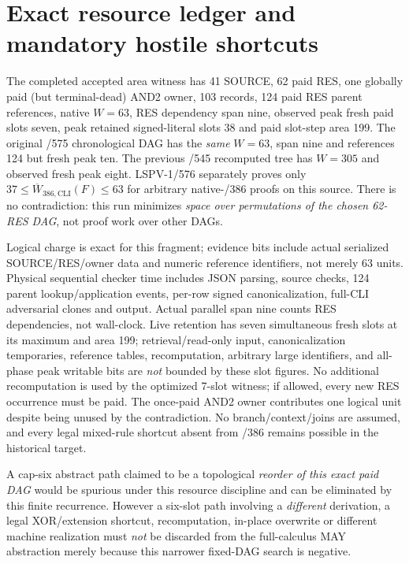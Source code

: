 \documentclass[11pt]{article}
\begin{document}
\section*{Exact resource ledger and mandatory hostile shortcuts}
The completed accepted area witness has 41 SOURCE, 62 paid RES, one globally paid (but terminal-dead) AND2 owner, 103 records, 124 paid RES parent references, native $W=63$, RES dependency span nine, observed peak fresh paid slots seven, peak retained signed-literal slots 38 and paid slot-step area 199. The original /575 chronological DAG has the \emph{same} $W=63$, span nine and references 124 but fresh peak ten. The previous /545 recomputed tree has $W=305$ and observed fresh peak eight. LSPV-1/576 separately proves only $37\le \overline W_{386,\mathrm{CLI}}(F)\le63$ for arbitrary native-/386 proofs on this source. There is no contradiction: this run minimizes \emph{space over permutations of the chosen 62-RES DAG}, not proof work over other DAGs.

Logical charge is exact for this fragment; evidence bits include actual serialized SOURCE/RES/owner data and numeric reference identifiers, not merely 63 units. Physical sequential checker time includes JSON parsing, source checks, 124 parent lookup/application events, per-row signed canonicalization, full-CLI adversarial clones and output. Actual parallel span nine counts RES dependencies, not wall-clock. Live retention has seven simultaneous fresh slots at its maximum and area 199; retrieval/read-only input, canonicalization temporaries, reference tables, recomputation, arbitrary large identifiers, and all-phase peak writable bits are \emph{not} bounded by these slot figures. No additional recomputation is used by the optimized 7-slot witness; if allowed, every new RES occurrence must be paid. The once-paid AND2 owner contributes one logical unit despite being unused by the contradiction. No branch/context/joins are assumed, and every legal mixed-rule shortcut absent from /386 remains possible in the historical target.

A cap-six abstract path claimed to be a topological \emph{reorder of this exact paid DAG} would be spurious under this resource discipline and can be eliminated by this finite recurrence. However a six-slot path involving a \emph{different} derivation, a legal XOR/extension shortcut, recomputation, in-place overwrite or different machine realization must \emph{not} be discarded from the full-calculus MAY abstraction merely because this narrower fixed-DAG search is negative.
\end{document}
